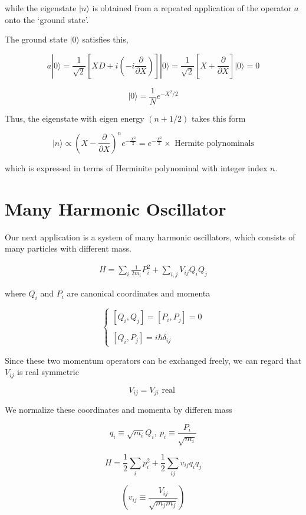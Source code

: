 while the eigenstate $|n\rangle$ is obtained from a repeated application of the operator $a$ onto the `ground state'. 

The ground state $|0\rangle$ satisfies this, 

\[a|0\rangle = \frac{1}{\sqrt{2}}\left[XD+i\left(-i\frac{\partial}{\partial X}\right)\right]|0\rangle = \frac{1}{\sqrt{2}}\left[X+\frac{\partial}{\partial X}\right]|0\rangle = 0 \]

\[|0\rangle = \frac{1}{N}e^{-X^2/2} \]

Thus, the eigenstate with eigen energy $(n+1/2)$ takes this form

\[|n\rangle \propto \left(X-\frac{\partial}{\partial X}\right)^n e^{-\frac{X^2}{2}} = e^{-\frac{X^2}{2}}\times\text{ Hermite polynominals} \]

which is expressed in terms of Herminite polynominal with integer index $n$. 




\section{Many Harmonic Oscillator}

Our next application is a system of many harmonic oscillators, which consists of many particles with different mass. 

\begin{align}
H = \sum_i \frac{1}{2m_i}P_i^2+\sum_{i,j}V_{ij}Q_iQ_j
\end{align}

where $Q_i$ and $P_i$ are canonical coordinates and momenta

\[\begin{cases}
[Q_i,Q_j] = [P_i,P_j] = 0\\
\ \\
[Q_i,P_j] = i\hbar\delta_{ij}
\end{cases}\]

Since these two momentum operators can be exchanged freely, we can regard that $V_{ij}$ is real symmetric

\[V_{ij} = V_{ji}\text{ real } \]

We normalize these coordinates and momenta by differen mass

\[q_i \equiv\sqrt{m_i}Q_i,\ p_i \equiv \frac{P_i}{\sqrt{m_i}} \]

\[H = \frac{1}{2}\sum_{i}p_i^2+\frac{1}{2}\sum_{ij}v_{ij}q_iq_j \]

\[(v_{ij} \equiv \frac{V_{ij}}{\sqrt{m_jm_j}} )\]

